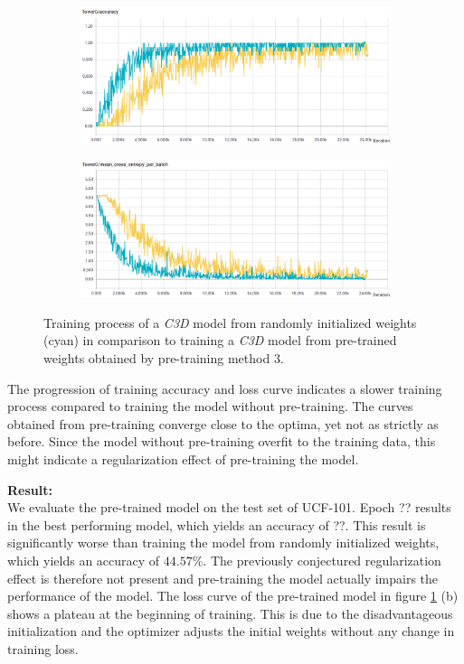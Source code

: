 \begin{figure}[H]
    \begin{subfigure}[c]{\textwidth}
    \includegraphics[width=\textwidth]{img_evaluation/pretrain3_initialized/tower0accuracy}
    \end{subfigure}
    \begin{subfigure}[c]{\textwidth}
    \includegraphics[width=\textwidth]{img_evaluation/pretrain3_initialized/tower0crossentropy}
    \end{subfigure}
    \caption{Training process of a \textit{C3D} model from randomly initialized weights (cyan) in comparison to training a \textit{C3D} model from pre-trained weights obtained by pre-training method 3.}
    \label{fig:pretrain3initializedUCF101}
\end{figure}

The progression of training accuracy and loss curve indicates a slower training process compared to training the model without pre-training.
The curves obtained from pre-training converge close to the optima, yet not as strictly as before.
Since the model without pre-training overfit to the training data, this might indicate a regularization effect of pre-training the model.

\textbf{Result:}\\
We evaluate the pre-trained model on the test set of UCF-101.
Epoch ?? results in the best performing model, which yields an accuracy of ??.
This result is significantly worse than training the model from randomly initialized weights, which yields an accuracy of $44.57\%$.
The previously conjectured regularization effect is therefore not present and pre-training the model actually impairs the performance of the model.
The loss curve of the pre-trained model in figure \ref{fig:pretrain3initializedUCF101} (b) shows a plateau at the beginning of training.
This is due to the disadvantageous initialization and the optimizer adjusts the initial weights without any change in training loss.


